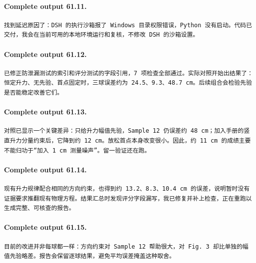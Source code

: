 \documentclass[UTF8,10pt]{ctexart}
\begin{document}
\paragraph{Complete output 61.11.}
\begin{Verbatim}[breaklines=true,breakanywhere=true,fontsize=\scriptsize,frame=single,framesep=2pt]
找到延迟原因了：DSH 的执行沙箱报了 Windows 目录权限错误，Python 没有启动。代码已交付，我会在当前可用的本地环境运行和复核，不修改 DSH 的沙箱设置。
\end{Verbatim}

\paragraph{Complete output 61.12.}
\begin{Verbatim}[breaklines=true,breakanywhere=true,fontsize=\scriptsize,frame=single,framesep=2pt]
已修正防泄漏测试的索引和评分测试的字段引用，7 项检查全部通过。实际对照开始出结果了：恒定升力、无先验、首点固定时，三球误差约为 24.5、9.3、48.7 cm。后续组合会检验先验是否能稳定改善它们。
\end{Verbatim}

\paragraph{Complete output 61.13.}
\begin{Verbatim}[breaklines=true,breakanywhere=true,fontsize=\scriptsize,frame=single,framesep=2pt]
对照已显示一个关键差异：只给升力幅值先验，Sample 12 仍误差约 48 cm；加入手册的竖直升力分量约束后，它降到约 12 cm。放松首点本身改变很小。因此，约 11 cm 的成绩主要不能归功于“加入 1 cm 测量噪声”。留一验证还在跑。
\end{Verbatim}

\paragraph{Complete output 61.14.}
\begin{Verbatim}[breaklines=true,breakanywhere=true,fontsize=\scriptsize,frame=single,framesep=2pt]
现有升力规律配合相同的方向约束，也得到约 13.2、8.3、10.4 cm 的误差，说明暂时没有证据要求推翻现有物理方程。结果汇总时发现评分字段漏写，我已修复并补上检查，正在重跑以生成完整、可核查的报告。
\end{Verbatim}

\paragraph{Complete output 61.15.}
\begin{Verbatim}[breaklines=true,breakanywhere=true,fontsize=\scriptsize,frame=single,framesep=2pt]
目前的改进并非每球都一样：方向约束对 Sample 12 帮助很大，对 Fig. 3 却比单独的幅值先验略差。报告会保留逐球结果，避免平均误差掩盖这种取舍。
\end{Verbatim}
\end{document}
